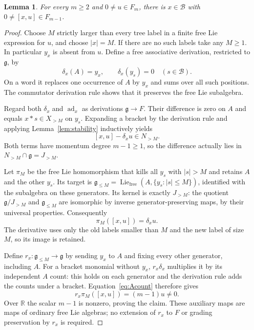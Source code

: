 \documentclass[11pt]{article}
\newtheorem{lemma}[theorem]{Lemma}
\newcommand{\R}{\mathbb R}
\newcommand{\g}{\mathfrak g}
\newcommand{\Lie}{\operatorname{Lie}}
\newcommand{\ad}{\operatorname{ad}}
\begin{document}
\begin{lemma}\label{lem:higher}
For every $m\ge2$ and $0\ne u\in F_m$, there is $x\in\mathcal B$ with
$0\ne[x,u]\in F_{m-1}$.
\end{lemma}
\begin{proof}
Choose $M$ strictly larger than every tree label in a finite free Lie
expression for $u$, and choose $|x|=M$. If there are no such labels take any
$M\ge1$. In particular $y_x$ is absent from $u$.
Define a free associative derivation, restricted to $\g$, by
\[
 \delta_x(A)=y_x,\qquad \delta_x(y_s)=0\quad(s\in\mathcal B).
\]
On a word it replaces one occurrence of $A$ by $y_x$ and sums over all such
positions. The commutator derivation rule shows that it preserves the free
Lie subalgebra.

Regard both $\delta_x$ and $\ad_x$ as derivations $\g\to F$. Their difference
is zero on $A$ and equals $x*s\in X_{>M}$ on $y_s$. Expanding a bracket by the
derivation rule and applying Lemma~\ref{lem:stability} inductively yields
\[
 [x,u]-\delta_xu\in N_{>M}.
\]
Both terms have momentum degree $m-1\ge1$, so the difference actually lies
in $N_{>M}\cap\g=J_{>M}$.

Let $\pi_M$ be the free Lie homomorphism that kills all $y_s$ with $|s|>M$
and retains $A$ and the other $y_s$. Its target is
$\g_{\le M}=\Lie_{\mathrm{free}}(A,\{y_s:|s|\le M\})$, identified with the
subalgebra on these generators. Its kernel is exactly $J_{>M}$: the quotient
$\g/J_{>M}$ and $\g_{\le M}$ are isomorphic by inverse
generator-preserving maps, by their universal properties. Consequently
\begin{equation}\label{eq:projection}
 \pi_M([x,u])=\delta_xu.
\end{equation}
The derivative uses only the old labels smaller than $M$ and the new label
of size $M$, so its image is retained.

Define $r_x:\g_{\le M}\to\g$ by sending $y_x$ to $A$ and fixing every other
generator, including $A$. For a bracket monomial without $y_x$,
$r_x\delta_x$ multiplies it by its independent $A$ count: this holds on each
generator and the derivation rule adds the counts under a bracket.
Equation~\eqref{eq:Acount} therefore gives
\begin{equation}\label{eq:euler}
 r_x\pi_M([x,u])=(m-1)u\ne0.
\end{equation}
Over $\R$ the scalar $m-1$ is nonzero, proving the claim. These auxiliary
maps are maps of ordinary free Lie algebras; no extension of $r_x$ to $F$
or grading preservation by $r_x$ is required.
\end{proof}
\end{document}

